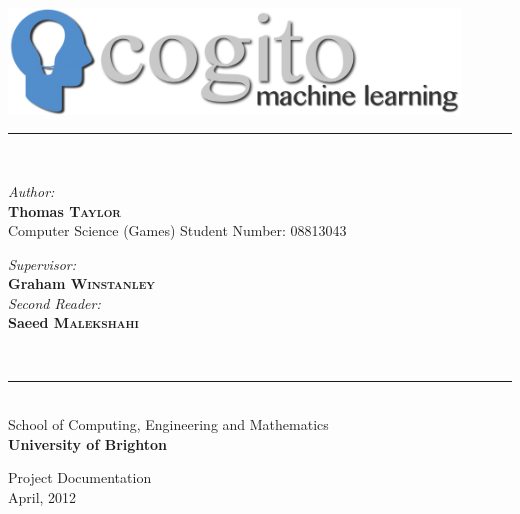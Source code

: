 \documentclass[a4paper,oneside]{report}
\newcommand{\HRuleLight}{\rule{\linewidth}{0.1mm}}
\begin{document}
%
%
\begin{titlepage}
\begin{center}

\includegraphics[width=120mm]{sources/images/cogito_logo_main.png}

\HRuleLight\\[0.5cm]

\begin{minipage}{0.45\textwidth}
	\begin{flushleft}\large
		\emph{Author:}\\
			\textbf{Thomas \textsc{Taylor}}\\[0.27cm]
			Computer Science (Games)
			Student Number: 08813043
	\end{flushleft}
\end{minipage}
\begin{minipage}{0.43\textwidth}
	\begin{flushright} \large
		\emph{Supervisor:} \\
		\textbf{Graham \textsc{Winstanley}}\\[0.25cm]
		\emph{Second Reader:}\\
		\textbf{Saeed \textsc{Malekshahi}}
	\end{flushright}
\end{minipage}\\[0.75cm] 

\HRuleLight\\[0.2cm]

\large School of Computing, Engineering and Mathematics\\ \textbf{University of Brighton}

\vfill
\huge Project Documentation\\
\large April, 2012\\

\end{center}
\end{titlepage}



%
%
{
	\renewcommand\thepage{}
	\setcounter{tocdepth}{3}
	\tableofcontents
	\clearpage
}

\setcounter{page}{1}
\end{document}
